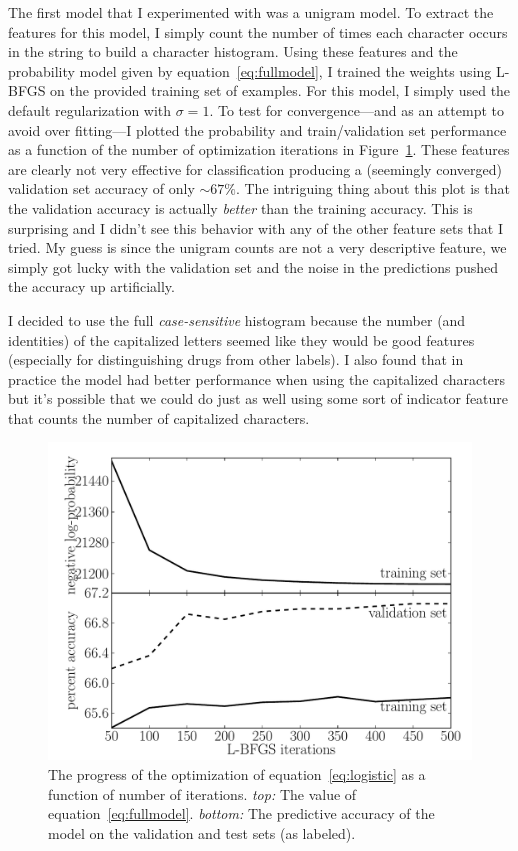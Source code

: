 \documentclass[11pt]{article}
\newcommand{\fig}[1]{Figure~\ref{fig:#1}}
\newcommand{\figlabel}[1]{\label{fig:#1}}
\newcommand{\code}[1]{{\sffamily #1}}
\begin{document}
The first model that I experimented with was a unigram model.
To extract the features for this model, I simply count the number of times
each character occurs in the string to build a character histogram.
Using these features and the probability model given by
equation~\ref{eq:fullmodel}, I trained the weights using \code{L-BFGS} on the
provided training set of examples.
For this model, I simply used the default regularization with $\sigma = 1$.
To test for convergence---and as an attempt to avoid over fitting---I plotted
the probability and train/validation set performance as a function of
the number of optimization iterations in \fig{unigram-convergence}.
These features are clearly not very effective for classification producing a
(seemingly converged) validation set accuracy of only $\sim67\%$.
The intriguing thing about this plot is that the validation accuracy is
actually \emph{better} than the training accuracy.
This is surprising and I didn't see this behavior with any of the other
feature sets that I tried.
My guess is since the unigram counts are not a very descriptive feature, we
simply got lucky with the validation set and the noise in the predictions
pushed the accuracy up artificially.

I decided to use the full \emph{case-sensitive} histogram because the number
(and identities) of the capitalized letters seemed like they would be good
features (especially for distinguishing \code{drug}s from other labels).
I also found that in practice the model had better performance when using the
capitalized characters but it's possible that we could do just as well using
some sort of indicator feature that counts the number of capitalized
characters.

\begin{figure}[htbp]
\begin{center}
    \includegraphics[width=\textwidth]{unigram_convergence.pdf}
\end{center}
\caption{%
The progress of the optimization of equation~\ref{eq:logistic} as a function
of number of iterations.
\emph{top:} The value of equation~\ref{eq:fullmodel}.
\emph{bottom:} The predictive accuracy of the model on the validation and test
sets (as labeled).
\figlabel{unigram-convergence}}
\end{figure}
\end{document}
